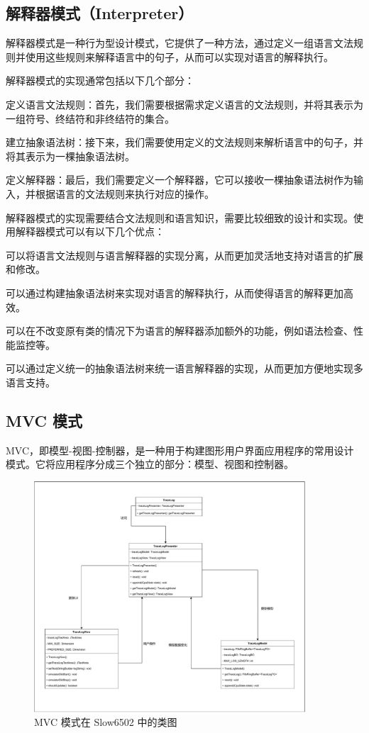 \documentclass[cn,black,12pt,normal]{elegantnote}
\begin{document}
\subsection{解释器模式（Interpreter）}

解释器模式是一种行为型设计模式，它提供了一种方法，通过定义一组语言文法规则并使用这些规则来解释语言中的句子，从而可以实现对语言的解释执行。

解释器模式的实现通常包括以下几个部分：

定义语言文法规则：首先，我们需要根据需求定义语言的文法规则，并将其表示为一组符号、终结符和非终结符的集合。

建立抽象语法树：接下来，我们需要使用定义的文法规则来解析语言中的句子，并将其表示为一棵抽象语法树。

定义解释器：最后，我们需要定义一个解释器，它可以接收一棵抽象语法树作为输入，并根据语言的文法规则来执行对应的操作。

解释器模式的实现需要结合文法规则和语言知识，需要比较细致的设计和实现。使用解释器模式可以有以下几个优点：

可以将语言文法规则与语言解释器的实现分离，从而更加灵活地支持对语言的扩展和修改。

可以通过构建抽象语法树来实现对语言的解释执行，从而使得语言的解释更加高效。

可以在不改变原有类的情况下为语言的解释器添加额外的功能，例如语法检查、性能监控等。

可以通过定义统一的抽象语法树来统一语言解释器的实现，从而更加方便地实现多语言支持。




\subsection{MVC 模式}

MVC，即模型-视图-控制器，是一种用于构建图形用户界面应用程序的常用设计模式。它将应用程序分成三个独立的部分：模型、视图和控制器。

\begin{figure}[H]
  \centering
  \includegraphics[width=0.9\textwidth]{figures/MVC模式.pdf}
  \caption{MVC 模式在 Slow6502 中的类图}
\end{figure}
\end{document}
